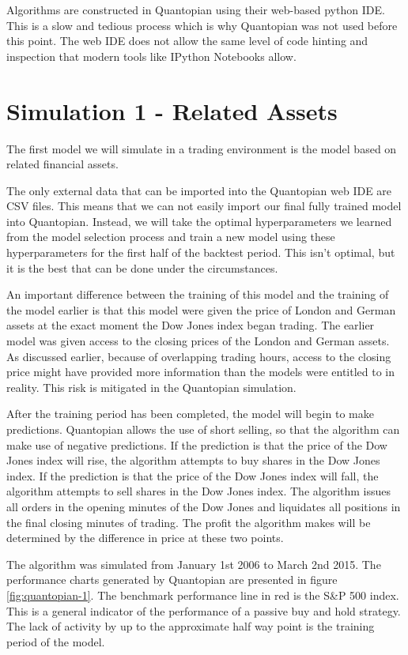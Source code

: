 \documentclass{report}
\begin{document}
Algorithms are constructed in Quantopian using their web-based python IDE. This is a slow and tedious process which is why Quantopian was not used before this point. The web IDE does not allow the same level of code hinting and inspection that modern tools like IPython Notebooks allow.

\section{Simulation 1 - Related Assets}

The first model we will simulate in a trading environment is the model based on related financial assets. 

The only external data that can be imported into the Quantopian web IDE are CSV files. This means that we can not easily import our final fully trained model into Quantopian. Instead, we will take the optimal hyperparameters we learned from the model selection process and train a new model using these hyperparameters for the first half of the backtest period. This isn't optimal, but it is the best that can be done under the circumstances.

An important difference between the training of this model and the training of the model earlier is that this model were given the price of London and German assets at the exact moment the Dow Jones index began trading. The earlier model was given access to the closing prices of the London and German assets. As discussed earlier, because of overlapping trading hours, access to the closing price might have provided more information than the models were entitled to in reality. This risk is mitigated in the Quantopian simulation.

After the training period has been completed, the model will begin to make predictions. Quantopian allows the use of short selling, so that the algorithm can make use of negative predictions. If the prediction is that the price of the Dow Jones index will rise, the algorithm attempts to buy shares in the Dow Jones index. If the prediction is that the price of the Dow Jones index will fall, the algorithm attempts to sell shares in the Dow Jones index. The algorithm issues all orders in the opening minutes of the Dow Jones and liquidates all positions in the final closing minutes of trading. The profit the algorithm makes will be determined by the difference in price at these two points.

The algorithm was simulated from January 1st 2006 to March 2nd 2015. The performance charts generated by Quantopian are presented in figure \ref{fig:quantopian-1}. The benchmark performance line in red is the S\&P 500 index. This is a general indicator of the performance of a passive buy and hold strategy. The lack of activity by up to the approximate half way point is the training period of the model.
\end{document}
